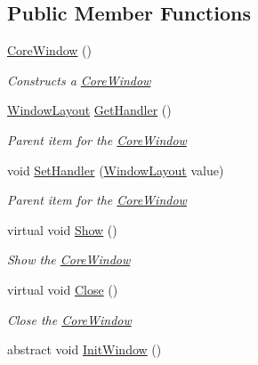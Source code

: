 \subsection*{Public Member Functions}
\begin{DoxyCompactItemize}
\item 
\mbox{\hyperlink{class_space_v_i_l_1_1_core_window_a49cb7bafc382c7d12250676e20c3327b}{Core\+Window}} ()
\begin{DoxyCompactList}\small\item\em Constructs a \mbox{\hyperlink{class_space_v_i_l_1_1_core_window}{Core\+Window}} \end{DoxyCompactList}\item 
\mbox{\hyperlink{class_space_v_i_l_1_1_window_layout}{Window\+Layout}} \mbox{\hyperlink{class_space_v_i_l_1_1_core_window_ac4c8503aa1fdd2ed2f0fd3ff278f8bee}{Get\+Handler}} ()
\begin{DoxyCompactList}\small\item\em Parent item for the \mbox{\hyperlink{class_space_v_i_l_1_1_core_window}{Core\+Window}} \end{DoxyCompactList}\item 
void \mbox{\hyperlink{class_space_v_i_l_1_1_core_window_a24e6d614aac5f7e1c8274edf92c214c5}{Set\+Handler}} (\mbox{\hyperlink{class_space_v_i_l_1_1_window_layout}{Window\+Layout}} value)
\begin{DoxyCompactList}\small\item\em Parent item for the \mbox{\hyperlink{class_space_v_i_l_1_1_core_window}{Core\+Window}} \end{DoxyCompactList}\item 
virtual void \mbox{\hyperlink{class_space_v_i_l_1_1_core_window_a6f25e26e98c54d56d93b0abfc88af3c0}{Show}} ()
\begin{DoxyCompactList}\small\item\em Show the \mbox{\hyperlink{class_space_v_i_l_1_1_core_window}{Core\+Window}} \end{DoxyCompactList}\item 
virtual void \mbox{\hyperlink{class_space_v_i_l_1_1_core_window_ab69ce6562a17e23166fedb8f3ce12fc1}{Close}} ()
\begin{DoxyCompactList}\small\item\em Close the \mbox{\hyperlink{class_space_v_i_l_1_1_core_window}{Core\+Window}} \end{DoxyCompactList}\item 
abstract void \mbox{\hyperlink{class_space_v_i_l_1_1_core_window_aa3cf4ac54d9651b1149584dc81042824}{Init\+Window}} ()

\end{DoxyCompactItemize}
